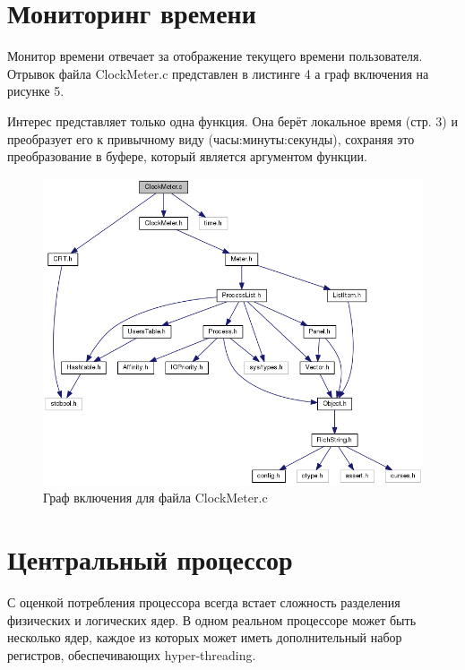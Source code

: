 \documentclass[a4paper, 12pt]{article}		%
\begin{document}
\newpage
\section{Мониторинг времени}

Монитор времени отвечает за отображение текущего времени пользователя. Отрывок файла ClockMeter.c представлен в листинге 4 а граф включения на рисунке 5.

Интерес представляет только одна функция. Она берёт локальное время (стр. 3) и преобразует его к привычному виду (часы:минуты:секунды), сохраняя это преобразование в буфере, который является аргументом функции.



\begin{figure}[h!]
\centering
\includegraphics[scale=0.5]{res/clock_meter.png}
\caption{Граф включения для файла ClockMeter.c}
\end{figure}

\newpage
\section{Центральный процессор}

С оценкой потребления процессора всегда встает сложность разделения физических и логических ядер. В одном реальном процессоре может быть несколько ядер, каждое из которых может иметь дополнительный набор регистров, обеспечивающих hyper-threading.
\end{document}
